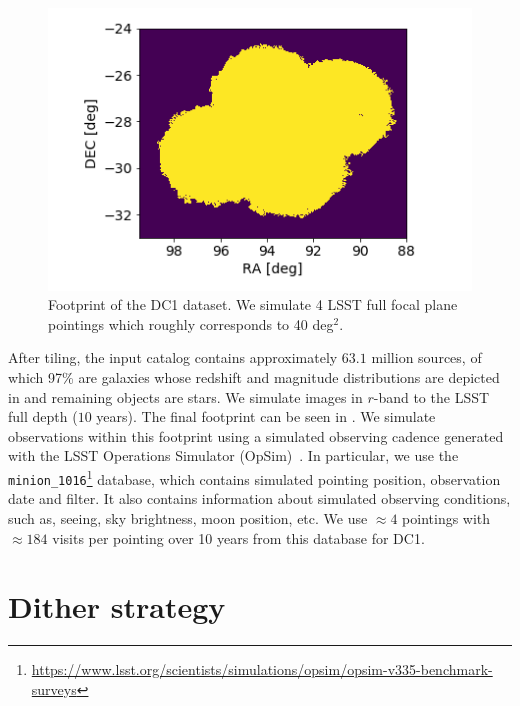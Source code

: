 \documentclass[twocolumn]{aastex62}
\begin{document}
\begin{figure}
\centering
\includegraphics[width=0.9\columnwidth]{footprint.png}
\caption{Footprint of the DC1 dataset. We simulate 4 LSST full focal plane pointings which roughly corresponds to 40 deg$^{2}$.}
\label{fig:footprint}
\end{figure}

After tiling, the input catalog contains approximately $63.1$ million sources, of which 97\% are galaxies whose redshift and magnitude distributions are depicted in  and remaining objects are stars. We simulate images in $r$-band to the LSST full depth ($10$ years). The final footprint can be seen in . We simulate observations within this footprint using a simulated observing cadence generated with the LSST Operations Simulator (OpSim)~\citep{2014SPIE.9150E..15D}. In particular, we use the \texttt{minion\_1016}\footnote{\url{https://www.lsst.org/scientists/simulations/opsim/opsim-v335-benchmark-surveys}} database, which contains simulated pointing position, observation date and filter. It also contains information about simulated observing conditions, such as, seeing, sky brightness, moon position, etc. We use $\approx 4$ pointings with $\approx 184$ visits per pointing over 10 years from this database for DC1.

\section{Dither strategy}
\label{sec:dithering}
\end{document}
